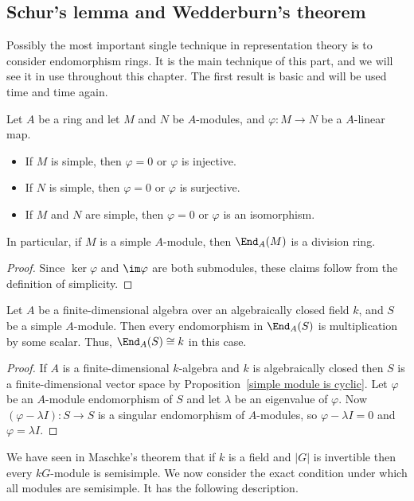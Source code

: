 \subsection{Schur's lemma and Wedderburn's theorem}
Possibly the most important single technique in representation theory is to consider endomorphism rings. It is the main technique of this part, and we will see it in use throughout this chapter. The first result is basic and will be used time and time again.
\begin{theorem}
Let $A$ be a ring and let $M$ and $N$ be $A$-modules, and $\varphi:M\to N$ be a $A$-linear map.
\begin{itemize}
\item If $M$ is simple, then $\varphi=0$ or $\varphi$ is injective.
\item If $N$ is simple, then $\varphi=0$ or $\varphi$ is surjective.
\item If $M$ and $N$ are simple, then $\varphi=0$ or $\varphi$ is an isomorphism.
\end{itemize}
In particular, if $M$ is a simple $A$-module, then $\End_A(M)$ is a division ring.
\end{theorem}
\begin{proof}
Since $\ker\varphi$ and $\im\varphi$ are both submodules, these claims follow from the definition of simplicity.
\end{proof}
\begin{corollary}\label{endomorphism of simple module scalar}
Let $A$ be a finite-dimensional algebra over an algebraically closed field $k$, and $S$ be a simple $A$-module. Then every endomorphism in $\End_A(S)$ is multiplication by some scalar. Thus, $\End_A(S)\cong k$ in this case.
\end{corollary}
\begin{proof}
If $A$ is a finite-dimensional $k$-algebra and $k$ is algebraically closed then $S$ is a finite-dimensional vector space by Proposition~\ref{simple module is cyclic}. Let $\varphi$ be an $A$-module endomorphism of $S$ and let $\lambda$ be an eigenvalue of $\varphi$. Now $(\varphi-\lambda I):S\to S$ is a singular endomorphism of $A$-modules, so $\varphi-\lambda I=0$ and $\varphi=\lambda I$.
\end{proof}
We have seen in Maschke's theorem that if $k$ is a field and $|G|$ is invertible then every $kG$-module is semisimple. We now consider the exact condition under which all modules are semisimple. It has the following description.
